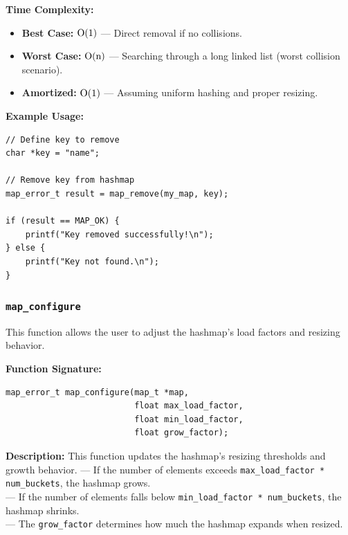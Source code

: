 \documentclass[titlepage]{article}
\begin{document}
\textbf{Time Complexity:}
\begin{itemize}
    \item \textbf{Best Case:} \( $O(1)$ \) --- Direct removal if no collisions.
    \item \textbf{Worst Case:} \( $O(n)$ \) --- Searching through a long linked list (worst collision scenario).
    \item \textbf{Amortized:} \( $O(1)$ \) --- Assuming uniform hashing and proper resizing.
\end{itemize}

\textbf{Example Usage:}
\begin{verbatim}
// Define key to remove
char *key = "name";

// Remove key from hashmap
map_error_t result = map_remove(my_map, key);

if (result == MAP_OK) {
    printf("Key removed successfully!\n");
} else {
    printf("Key not found.\n");
}
\end{verbatim}

\subsubsection{\texttt{map\_configure}} %

This function allows the user to adjust the hashmap's load factors and resizing behavior.

\textbf{Function Signature:}
\begin{verbatim}
map_error_t map_configure(map_t *map,
                          float max_load_factor,
                          float min_load_factor,
                          float grow_factor);
\end{verbatim}

\textbf{Description:}
This function updates the hashmap's resizing thresholds and growth behavior.
--- If the number of elements exceeds \texttt{max\_load\_factor * num\_buckets}, the hashmap grows.\\
--- If the number of elements falls below \texttt{min\_load\_factor * num\_buckets}, the hashmap shrinks.\\
--- The \texttt{grow\_factor} determines how much the hashmap expands when resized.
\end{document}
